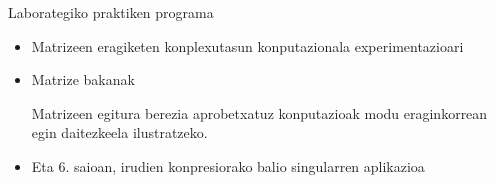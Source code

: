 \documentclass[
 10pt,%
 compress,%
 t,       %
 xcolor=svgnames
]{beamer}
\theoremstyle{definition} \newtheorem{definicion}{Definicion}[section]
\theoremstyle{propiedades} \newtheorem{propiedades}{Propiedades}[section]
\begin{document}
\begin{frame}{Laborategiko praktiken programa}
{\begin{itemize}
	
	\medskip
	\item Matrizeen eragiketen konplexutasun konputazionala experimentazioari
	
    	
    	
    
    \medskip
    \item  Matrize bakanak
    
    
	
	Matrizeen egitura berezia aprobetxatuz konputazioak modu eraginkorrean egin daitezkeela ilustratzeko.
	
	\medskip
	\item Eta 6. saioan, irudien konpresiorako balio singularren aplikazioa
\end{itemize}

    



}


\end{frame}










%
%

\end{document}
